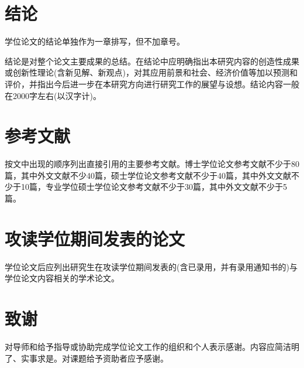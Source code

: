 \section{结论}
学位论文的结论单独作为一章排写，但不加章号。\par
结论是对整个论文主要成果的总结。在结论中应明确指出本研究内容的创造性成果或创新性理论(含新见解、新观点)，对其应用前景和社会、经济价值等加以预测和评价，并指出今后进一步在本研究方向进行研究工作的展望与设想。结论内容一般在2000字左右(以汉字计)。
\section{参考文献}
按文中出现的顺序列出直接引用的主要参考文献。博士学位论文参考文献不少于80篇，其中外文文献不少40篇，硕士学位论文参考文献不少于40篇，其中外文文献不少于10篇，专业学位硕士学位论文参考文献不少于30篇，其中外文文献不少于5篇。
\section{攻读学位期间发表的论文}
学位论文后应列出研究生在攻读学位期间发表的(含已录用，并有录用通知书的)与学位论文内容相关的学术论文。
\section{致谢}
对导师和给予指导或协助完成学位论文工作的组织和个人表示感谢。内容应简洁明了、实事求是。对课题给予资助者应予感谢。

